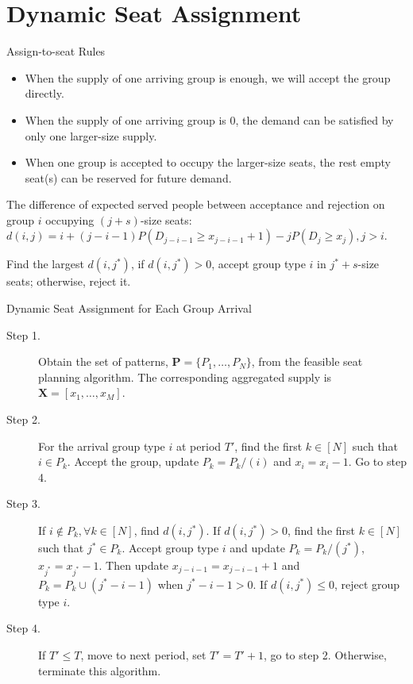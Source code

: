 
\section{Dynamic Seat Assignment}
    \frame{\sectionpage}

    \begin{frame}{Assign-to-seat Rules}
        \begin{itemize}
          \item When the supply of one arriving group is enough, we will accept the group directly.
          \item When the supply of one arriving group is 0, the demand can be satisfied by only one larger-size supply.
          \item When one group is accepted to occupy the larger-size seats, the rest empty seat(s) can be reserved for future demand.
      \end{itemize}
      The difference of expected served people between acceptance and rejection on group $i$ occupying $(j+s)$-size seats: $d(i,j) = i + (j-i-1)P(D_{j-i-1} \geq x_{j-i-1}+1) - j P(D_{j} \geq x_{j}), j >i$.

      Find the largest $d(i,j^{*})$, if $d(i,j^{*}) > 0$, accept group type $i$ in $j^{*}+s$-size seats; otherwise, reject it.
      \end{frame}

    \begin{frame}{Dynamic Seat Assignment for Each Group Arrival}
        \begin{description}
          \item[Step 1.] Obtain the set of patterns, $\mathbf{P} = \{P_1,\ldots,P_{N}\}$, from the feasible seat planning algorithm. The corresponding aggregated supply is $\mathbf{X} = [x_{1}, \ldots, x_{M}]$.
          \item[Step 2.] For the arrival group type $i$ at period $T{'}$, find the first $k \in [N]$ such that $i \in P_k$. Accept the group, update $P_{k} = P_{k}/(i)$ and $x_{i} = x_{i} -1$. Go to step 4.
          \item[Step 3.] If $i \notin P_k, \forall k \in [N]$, find $d(i,j^{*})$. If $d(i,j^{*})>0$, find the first $k \in [N]$ such that $j^{*} \in P_k$. Accept group type $i$ and update $P_{k} = P_{k}/(j^{*})$, $x_{j^{*}} = x_{j^{*}} -1$. Then update $x_{j-i-1} = x_{j-i-1} + 1$ and $P_{k}= P_{k} \cup (j^{*}-i-1)$ when $j^{*}-i-1 > 0$. If $d(i,j^{*}) \leq 0$, reject group type $i$.
          \item[Step 4.] If $T{'} \leq T$, move to next period, set $T{'} = T{'}+1$, go to step 2. Otherwise, terminate this algorithm.
        \end{description}
      \end{frame}
      
